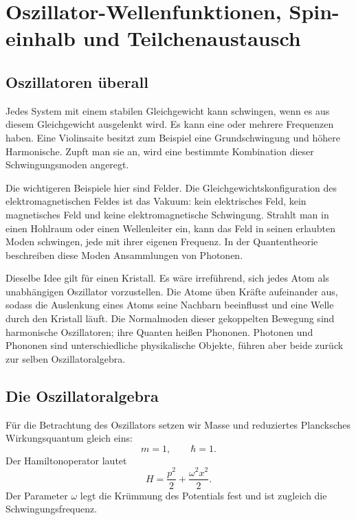 \chapter{Oszillator-Wellenfunktionen, Spin-einhalb und Teilchenaustausch}

\section{Oszillatoren überall}

Jedes System mit einem stabilen Gleichgewicht kann schwingen, wenn es aus diesem Gleichgewicht ausgelenkt wird. Es kann eine oder mehrere Frequenzen haben. Eine Violinsaite besitzt zum Beispiel eine Grundschwingung und höhere Harmonische. Zupft man sie an, wird eine bestimmte Kombination dieser Schwingungsmoden angeregt.

Die wichtigeren Beispiele hier sind Felder. Die Gleichgewichtskonfiguration des elektromagnetischen Feldes ist das Vakuum: kein elektrisches Feld, kein magnetisches Feld und keine elektromagnetische Schwingung. Strahlt man in einen Hohlraum oder einen Wellenleiter ein, kann das Feld in seinen erlaubten Moden schwingen, jede mit ihrer eigenen Frequenz. In der Quantentheorie beschreiben diese Moden Ansammlungen von Photonen.

Dieselbe Idee gilt für einen Kristall. Es wäre irreführend, sich jedes Atom als unabhängigen Oszillator vorzustellen. Die Atome üben Kräfte aufeinander aus, sodass die Auslenkung eines Atoms seine Nachbarn beeinflusst und eine Welle durch den Kristall läuft. Die Normalmoden dieser gekoppelten Bewegung sind harmonische Oszillatoren; ihre Quanten heißen Phononen. Photonen und Phononen sind unterschiedliche physikalische Objekte, führen aber beide zurück zur selben Oszillatoralgebra.

\section{Die Oszillatoralgebra}

Für die Betrachtung des Oszillators setzen wir Masse und reduziertes Plancksches Wirkungsquantum gleich eins:
\[
m=1,\qquad \hbar=1.
\]
Der Hamiltonoperator lautet
\begin{equation}
H=\frac{p^{2}}{2}+\frac{\omega^{2}x^{2}}{2}.
\end{equation}
Der Parameter \(\omega\) legt die Krümmung des Potentials fest und ist zugleich die Schwingungsfrequenz.

